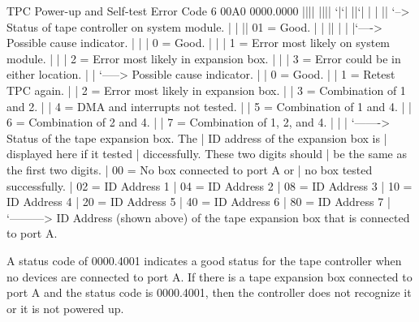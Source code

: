 \begin{ttfig}{TPC Power-up and Self-test Error Code}
6  00A0 0000.0000
        |||| ||||
        `|`| ||`|
         | | || `--> Status of tape controller on system module.
         | | ||       01 = Good.
         | | ||
         | | |`----> Possible cause indicator.
         | | |        0 = Good.
         | | |        1 = Error most likely on system module.
         | | |        2 = Error most likely in expansion box.
         | | |        3 = Error could be in either location.
         | | `-----> Possible cause indicator.
         | |          0 = Good.
         | |          1 = Retest TPC again.
         | |          2 = Error most likely in expansion box.
         | |          3 = Combination of 1 and 2.
         | |          4 = DMA and interrupts not tested.
         | |          5 = Combination of 1 and 4.
         | |          6 = Combination of 2 and 4.
         | |          7 = Combination of 1, 2, and 4.
         | |          
         | `-------> Status of the tape expansion box. The
         |           ID address of the expansion box is
         |           displayed here if it tested
         |           diccessfully. These two digits should
         |           be the same as the first two digits.
         |            00 = No box connected to port A or
         |                 no box tested successfully.
         |            02 = ID Address 1
         |            04 = ID Address 2
         |            08 = ID Address 3
         |            10 = ID Address 4
         |            20 = ID Address 5
         |            40 = ID Address 6
         |            80 = ID Address 7
         |
         `---------> ID Address (shown above) of the tape
                     expansion box that is connected to
                     port A.
\end{ttfig}

A status code of 0000.4001 indicates a good status for the tape controller
when no devices are connected to port A. If there is a tape expansion box
connected to port A and the status code is 0000.4001, then the controller
does not recognize it or it is not powered up.

